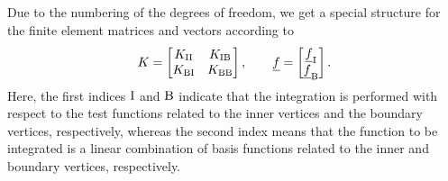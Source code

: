 \documentclass[a4paper,10pt]{article}
\numberwithin{theorem}{section}
\begin{document}
Due to the numbering of the degrees of freedom, we get a special structure for the finite element matrices and vectors according to 
\begin{equation*}
  K = \begin{bmatrix}
    K_{\textup{II}} & K_{\textup{IB}}
    \\
    K_{\textup{BI}} & K_{\textup{BB}}
  \end{bmatrix},
  \qquad
  \underline f = \begin{bmatrix}
    \underline f_{\textup{I}} \\
   \underline f_{\textup{B}}
  \end{bmatrix}.
\end{equation*}
Here, the first indices $\textup{I}$ and $\textup{B}$ indicate that the integration is performed with respect to the test functions related to the inner vertices and the boundary vertices, respectively, whereas the second index means that the function to be integrated is a linear combination of basis functions related to the inner and boundary vertices, respectively.  
\end{document}

